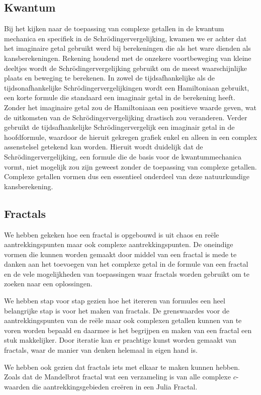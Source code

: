\documentclass[11pt,fleqn]{book} %
\begin{document}
\subsection{Kwantum}
Bij het kijken naar de toepassing van complexe getallen in de kwantum mechanica en specifiek in de Schrödingervergelijking, kwamen we er achter dat het imaginaire getal gebruikt werd bij berekeningen die als het ware dienden als kansberekeningen. Rekening houdend met de onzekere voortbeweging van kleine deeltjes wordt de Schrödingervergelijking gebruikt om de meest waarschijnlijke plaats en beweging te berekenen. 
In zowel de tijdsafhankelijke als de tijdsonafhankelijke Schrödingervergelijkingen wordt een Hamiltoniaan gebruikt, een korte formule die standaard een imaginair getal in de berekening heeft. Zonder het imaginaire getal zou de Hamiltoniaan een positieve waarde geven, wat de uitkomsten van de Schrödingervergelijking drastisch zou veranderen. Verder gebruikt de tijdsafhankelijke Schrödingervergelijk een imaginair getal in de hoofdformule, waardoor de hieruit gekregen grafiek enkel en alleen in een complex assenstelsel getekend kan worden.
Hieruit wordt duidelijk dat de Schrödingervergelijking, een formule die de basis voor de kwantummechanica vormt, niet mogelijk zou zijn geweest zonder de toepassing van complexe getallen. Complexe getallen vormen dus een essentieel onderdeel van deze natuurkundige kansberekening.

\subsection{Fractals}
We hebben gekeken hoe een fractal is opgebouwd is uit chaos en reële aantrekkingspunten maar ook complexe aantrekkingspunten. De oneindige vormen die kunnen worden gemaakt door middel van een fractal is mede te danken aan het toevoegen van het complexe getal in de formule van een fractal en de vele mogelijkheden van toepassingen waar fractals worden gebruikt om te zoeken naar een oplossingen.

We hebben stap voor stap gezien hoe het itereren van formules een heel belangrijke stap is voor het maken van fractals. De grenswaardes voor de aantrekkingspunten van de reële maar ook complexen getallen kunnen van te voren worden bepaald en daarmee is het begrijpen en maken van een fractal een stuk makkelijker. Door iteratie kan er prachtige kunst worden gemaakt van fractals, waar de manier van denken helemaal in eigen hand is.

We hebben ook gezien dat fractals iets met elkaar te maken kunnen hebben. Zoals dat de Mandelbrot fractal wat een verzameling is van alle complexe $c$-waarden die aantrekkingsgebieden creëren in een Julia Fractal.
\end{document}
